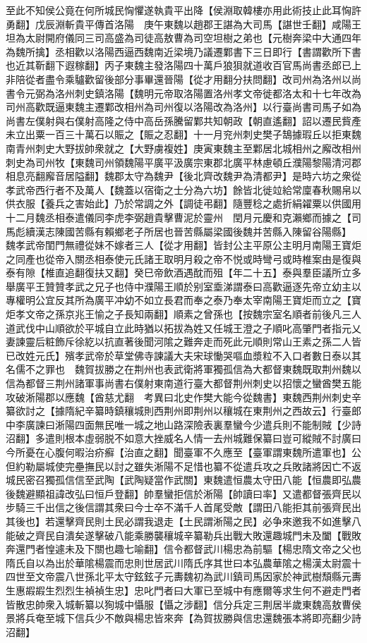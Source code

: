 至此不知侯公竟在何所城民恟懼遂執貴平出降【侯淵取韓樓亦用此術技止此耳恟許勇翻】戊辰淵斬貴平傳首洛陽　庚午東魏以趙郡王諶為大司馬【諶世壬翻】咸陽王坦為太尉開府儀同三司高盛為司徒高敖曹為司空坦樹之弟也【元樹奔梁中大通四年為魏所擒】丞相歡以洛陽西逼西魏南近梁境乃議遷鄴書下三日即行【書謂歡所下書也近其靳翻下遐稼翻】丙子東魏主發洛陽四十萬戶狼狽就道收百官馬尚書丞郎已上非陪從者盡令乘驢歡留後部分事畢還晉陽【從才用翻分扶問翻】改司州為洛州以尚書令元弼為洛州刺史鎮洛陽【魏明元帝取洛陽置洛州孝文帝徙都洛太和十七年改為司州高歡既逼東魏主遷鄴改相州為司州復以洛陽改為洛州】以行臺尚書司馬子如為尚書左僕射與右僕射高隆之侍中高岳孫騰留鄴共知朝政【朝直遙翻】詔以遷民貲產未立出粟一百三十萬石以賑之【賑之忍翻】十一月兖州刺史樊子鵠據瑕丘以拒東魏南青州刺史大野拔帥衆就之【大野虜複姓】庚寅東魏主至鄴居北城相州之廨改相州刺史為司州牧【東魏司州領魏陽平廣平汲廣宗東郡北廣平林慮頓丘濮陽黎陽清河郡相息亮翻廨音居隘翻】魏郡太守為魏尹【後北齊改魏尹為清都尹】是時六坊之衆從孝武帝西行者不及萬人【魏蓋以宿衛之士分為六坊】餘皆北徙竝給常廩春秋賜帛以供衣服【養兵之害始此】乃於常調之外【調徒弔翻】隨豐稔之處折絹糴粟以供國用　十二月魏丞相泰遣儀同李虎李弼趙貴擊曹泥於靈州　閏月元慶和克瀨鄉而據之【司馬彪續漢志陳國苦縣有賴鄉老子所居也晉苦縣屬梁國後魏并苦縣入陳留谷陽縣】　魏孝武帝閨門無禮從妹不嫁者三人【從才用翻】皆封公主平原公主明月南陽王寶炬之同產也從帝入關丞相泰使元氏諸王取明月殺之帝不悦或時彎弓或時椎案由是復與泰有隙【椎直追翻復扶又翻】癸巳帝飲酒遇酖而殂【年二十五】泰與羣臣議所立多舉廣平王贊贊孝武之兄子也侍中濮陽王順於别室埀涕謂泰曰高歡逼逐先帝立幼主以專權明公宜反其所為廣平冲幼不如立長君而奉之泰乃奉太宰南陽王寶炬而立之【寶炬孝文帝之孫京兆王愉之子長知兩翻】順素之曾孫也【按魏宗室名順者前後凡三人道武伐中山順欲於平城自立此時猶以拓拔為姓又任城王澄之子順叱高肇門者指元乂妻諫靈后粧飾斥徐紇以抗直著後聞河隂之難奔走而死此元順則常山王素之孫二人皆已改姓元氏】殯孝武帝於草堂佛寺諫議大夫宋球慟哭嘔血漿粒不入口者數日泰以其名儒不之罪也　魏賀拔勝之在荆州也表武衛將軍獨孤信為大都督東魏既取荆州魏以信為都督三荆州諸軍事尚書右僕射東南道行臺大都督荆州刺史以招懷之蠻酋樊五能攻破淅陽郡以應魏【酋慈尤翻　考異曰北史作樊大能今從魏書】東魏西荆州刺史辛纂欲討之【據隋紀辛纂時鎮穰城則西荆州即荆州以穰城在東荆州之西故云】行臺郎中李廣諫曰淅陽四面無民唯一城之地山路深險表裏羣蠻今少遣兵則不能制賊【少詩沼翻】多遣則根本虛弱脱不如意大挫威名人情一去州城難保纂曰豈可縱賊不討廣曰今所憂在心腹何暇治疥癬【治直之翻】聞臺軍不久應至【臺軍謂東魏所遣軍也】公但約勒屬城使完壘撫民以討之雖失淅陽不足惜也纂不從遣兵攻之兵敗諸將因亡不返城民密召獨孤信信至武陶【武陶疑當作武關】東魏遣恒農太守田八能【恒農即弘農後魏避顯祖諱改弘曰恒戶登翻】帥羣蠻拒信於淅陽【帥讀曰率】又遣都督張齊民以步騎三千出信之後信謂其衆曰今士卒不滿千人首尾受敵【謂田八能拒其前張齊民出其後也】若還擊齊民則土民必謂我退走【土民謂淅陽之民】必争來邀我不如進擊八能破之齊民自潰矣遂擊破八能乘勝襲穰城辛纂勒兵出戰大敗還趣城門未及闔【戰敗奔還門者惶遽未及下關也趣七喻翻】信令都督武川楊忠為前驅【楊忠隋文帝之父也隋氏自以為出於華隂楊震而忠則世居武川隋氏序其世曰本弘農華隂之楊漢太尉震十四世至文帝震八世孫北平太守鉉鉉子元夀魏初為武川鎮司馬因家於神武樹頹縣元夀生惠嘏嘏生烈烈生禎禎生忠】忠叱門者曰大軍已至城中有應爾等求生何不避走門者皆散忠帥衆入城斬纂以狥城中懾服【懾之涉翻】信分兵定三荆居半歲東魏高敖曹侯景將兵奄至城下信兵少不敵與楊忠皆來奔【為賀拔勝與信忠還魏張本將即亮翻少詩沼翻】

